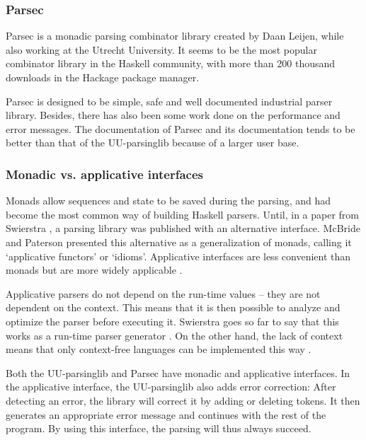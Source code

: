 \subsubsection{Parsec}
%
Parsec is a monadic parsing combinator library created by Daan Leijen, while also working at the Utrecht University.
It seems to be the most popular combinator library in the Haskell community, with more than 200 thousand downloads in the Hackage package manager.

Parsec is designed to be simple, safe and well documented industrial parser library.
Besides, there has also been some work done on the performance and error messages.
The documentation of Parsec and its documentation tends to be better than that of the UU-parsinglib because of a larger user base.


\subsubsection{Monadic vs. applicative interfaces}
Monads allow sequences and state to be saved during the parsing, and had become the most common way of building Haskell parsers.
Until, in a paper from Swierstra , a parsing library was published with an alternative interface.
McBride and Paterson presented this alternative as a generalization of monads, calling it `applicative functors' or `idioms'.
Applicative interfaces are less convenient than monads but are more widely applicable .

Applicative parsers do not depend on the run-time values -- they are not dependent on the context.
This means that it is then possible to analyze and optimize the parser before executing it.
Swierstra goes so far to say that this works as a run-time parser generator .
On the other hand, the lack of context means that only context-free languages can be implemented this way .

Both the UU-parsinglib and Parsec have monadic and applicative interfaces.
In the applicative interface, the UU-parsinglib also adds error correction:
After detecting an error, the library will correct it by adding or deleting tokens.
It then generates an appropriate error message and continues with the rest of the program.
By using this interface, the parsing will thus always succeed.

